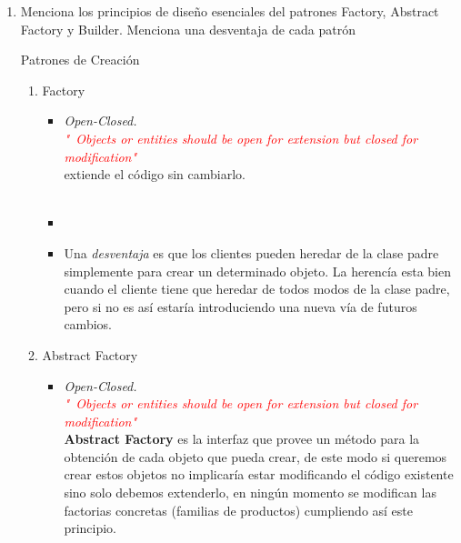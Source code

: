 \documentclass[a4paper,10pt]{article}
\begin{document}
\begin{enumerate}
    
    \item Menciona los principios de diseño esenciales del patrones Factory, Abstract Factory y Builder. Menciona una desventaja de cada patrón 
    
    Patrones de Creación 

        \begin{enumerate}
            \item \colorbox[rgb]{0.53, 0.81, 0.98}{Factory}
            \begin{itemize}
                \item [\Checkmark] \textit{Open-Closed.} \\
                \textcolor{red}{\textit{ "\ Objects or entities should be open for extension but closed for modification"}}\\
                 extiende el código sin cambiarlo.\\\\

                 \item [\Checkmark]
                     
                \item [\XSolidBrush ] Una \textit{desventaja} es que los clientes pueden heredar de la clase padre simplemente para crear un determinado objeto.
                      La herencía esta bien cuando el cliente tiene que heredar de todos modos de la clase padre, pero si no es así estaría introduciendo una
                      nueva vía de futuros cambios. \\
                      
            \end{itemize}

            
            \item \colorbox[rgb]{1.0, 0.71, 0.76}{Abstract Factory}
            \begin{itemize}
                \item [\Checkmark] \textit{Open-Closed.} \\
                \textcolor{red}{\textit{ "\ Objects or entities should be open for extension but closed for modification"}}\\
                \textbf{Abstract Factory }es la interfaz que provee un método para la obtención de cada objeto que pueda crear, de este modo si queremos crear estos objetos no implicaría estar modificando el código existente 
                sino solo debemos extenderlo, en ningún momento se modifican las factorias concretas (familias de productos) cumpliendo así este principio.
                

\end{itemize}
\end{enumerate}
\end{enumerate}
\end{document}
